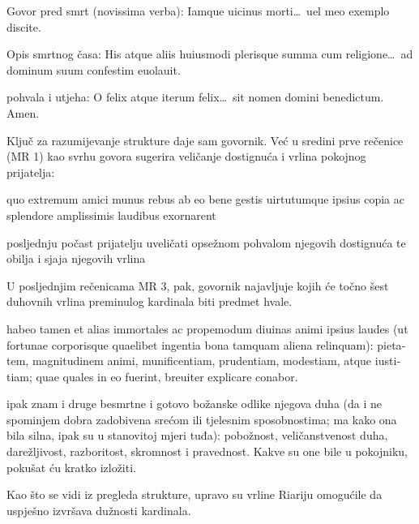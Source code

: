 \documentclass[a5paper,twoside]{article}
\renewenvironment{quote}
               {\list{}{\rightmargin 0mm
                \leftmargin 7mm
                \itemindent 0em}%
                \item\relax}
               {\endlist}
\begin{document}
\begin{description}[nolistsep,itemsep=3pt,font=\rmfamily]
\begin{description}[nolistsep,itemsep=3pt,font=\rmfamily]
\begin{description}[nolistsep,itemsep=3pt,font=\rmfamily]
\item[2.12.3. MR 20–21] Govor pred smrt \textlatin{(novissima verba): Iamque uicinus morti\dots\ uel meo exemplo discite.}
\item[2.12.4. MR 22] Opis smrtnog časa: \textlatin{His atque aliis huiusmodi plerisque summa cum religione\dots\ ad dominum suum confestim euolauit.}
\end{description}
\end{description}
\item[3. MR 23 Završetak (peroratio)] pohvala i utjeha: \textlatin{O felix atque iterum felix\dots\ sit nomen domini benedictum. Amen.}
\end{description}

Ključ za razumijevanje strukture daje sam govornik. Već u sredini prve rečenice (MR 1) kao svrhu govora sugerira veličanje dostignuća i vrlina pokojnog prijatelja:

\begin{quote}
\begin{latin}
quo extremum amici munus rebus ab eo bene gestis uirtutumque ipsius copia ac splendore amplissimis laudibus exornarent
\end{latin}

posljednju počast prijatelju uveličati opsežnom pohvalom njegovih dostignuća te obilja i sjaja njegovih vrlina
\end{quote}

U posljednjim rečenicama MR 3, pak, govornik najavljuje kojih će točno šest duhovnih vrlina preminulog kardinala biti predmet hvale.

\begin{quote}
\begin{latin}
habeo tamen et alias immortales ac propemodum diuinas animi ipsius laudes (ut fortunae corporisque quaelibet ingentia bona tamquam aliena relinquam): pietatem, magnitudinem animi, munificentiam, prudentiam, modestiam, atque iustitiam; quae quales in eo fuerint, breuiter explicare conabor.
\end{latin}

ipak znam i druge besmrtne i gotovo božanske odlike njegova duha (da i ne spominjem dobra zadobivena srećom ili tjelesnim sposobnostima; ma kako ona bila silna, ipak su u stanovitoj mjeri tuđa): pobožnost, veličanstvenost duha, darežljivost, razboritost, skromnost i pravednost.  Kakve su one bile u pokojniku, pokušat ću kratko izložiti.
\end{quote}

Kao što se vidi iz pregleda strukture, upravo su vrline Riariju omogućile da uspješno izvršava dužnosti kardinala.
\end{document}
